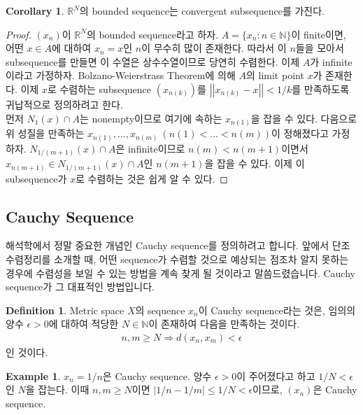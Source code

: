 \documentclass[12pt]{article}
\theoremstyle{definition}
\newtheorem{cor}[thm]{Corollary}
\newtheorem{defn}[thm]{Definition}
\newtheorem*{ex}{Example}
\def\NN{\mathbb{N}}
\def\RR{\mathbb{R}}
\def\eps{\epsilon}
\newcommand{\norm}[1]{\left\vert\left\vert#1\right\vert\right\vert}
\begin{document}
	\begin{cor} \label{cor bdd conv}
		\(\RR^N\)의 bounded sequence는 convergent subsequence를 가진다.
	\end{cor}
	\begin{proof}
		\((x_n)\)이 \(\RR^N\)의 bounded sequence라고 하자. \(A = \{x_n: n \in \NN \}\)이 finite이면, 어떤 \(x \in A\)에 대하여 \(x_n = x\)인 \(n\)이 무수히 많이 존재한다. 따라서 이 \(n\)들을 모아서 subsequence를 만들면 이 수열은 상수수열이므로 당연히 수렴한다. 이제 \(A\)가 infinite이라고 가정하자. Bolzano-Weierstrass Theorem에 의해 \(A\)의 limit point \(x\)가 존재한다. 이제 \(x\)로 수렴하는 subsequence \((x_{n(k)})\)를 \(\norm{x_{n(k)} - x} < 1/k\)를 만족하도록 귀납적으로 정의하려고 한다.\\
		먼저 \(N_1 (x) \cap A\)는 nonempty이므로 여기에 속하는 \(x_{n(1)}\)을 잡을 수 있다. 다음으로 위 성질을 만족하는 \(x_{n(1)}, ..., x_{n(m)} \: (n(1) < ... < n(m))\)이 정해졌다고 가정하자. \(N_{1/(m+1)} (x) \cap A\)은 infinite이므로 \(n(m) < n(m+1)\)이면서 \(x_{n(m+1)} \in N_{1/(m+1)} (x) \cap A\)인 \(n(m+1)\)을 잡을 수 있다. 이제 이 subsequence가 \(x\)로 수렴하는 것은 쉽게 알 수 있다.
	\end{proof}

\subsection{Cauchy Sequence}

해석학에서 정말 중요한 개념인 Cauchy sequence를 정의하려고 합니다. 앞에서 단조수렴정리를 소개할 때, 어떤 sequence가 수렴할 것으로 예상되는 점조차 알지 못하는 경우에 수렴성을 보일 수 있는 방법을 계속 찾게 될 것이라고 말씀드렸습니다. Cauchy sequence가 그 대표적인 방법입니다.

	\begin{defn}
		Metric space \(X\)의 sequence \(x_n\)이 Cauchy sequence라는 것은, 임의의 양수 \(\eps > 0\)에 대하여 적당한 \(N \in \NN\)이 존재하여 다음을 만족하는 것이다.
		\begin{gather*}
			n, m \ge N \Longrightarrow d(x_n, x_m) < \eps
		\end{gather*} 인 것이다.
	\end{defn}

	\begin{ex}
		\(x_n = 1/n\)은 Cauchy sequence. 양수 \(\eps > 0\)이 주어졌다고 하고 \(1/N < \eps\)인 \(N\)을 잡는다. 이때 \(n, m \ge N\)이면 \(|1/n - 1/m| \le 1/N < \eps\)이므로, \((x_n)\)은 Cauchy sequence.
	\end{ex}
\end{document}
